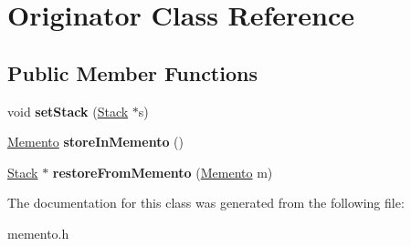 \hypertarget{class_originator}{}\section{Originator Class Reference}
\label{class_originator}
\subsection*{Public Member Functions}
\begin{DoxyCompactItemize}
\item 
void {\bfseries set\+Stack} (\hyperlink{class_stack}{Stack} $\ast$s)\hypertarget{class_originator_a2ec52c4bc4d9e2112ed69add7bfe4024}{}\label{class_originator_a2ec52c4bc4d9e2112ed69add7bfe4024}

\item 
\hyperlink{class_memento}{Memento} {\bfseries store\+In\+Memento} ()\hypertarget{class_originator_a8a13e62dc073a01209075f117c0c4ff0}{}\label{class_originator_a8a13e62dc073a01209075f117c0c4ff0}

\item 
\hyperlink{class_stack}{Stack} $\ast$ {\bfseries restore\+From\+Memento} (\hyperlink{class_memento}{Memento} m)\hypertarget{class_originator_a180058583fd3a64798d0066ab360c3c6}{}\label{class_originator_a180058583fd3a64798d0066ab360c3c6}

\end{DoxyCompactItemize}


The documentation for this class was generated from the following file\+:\begin{DoxyCompactItemize}
\item 
memento.\+h\end{DoxyCompactItemize}
